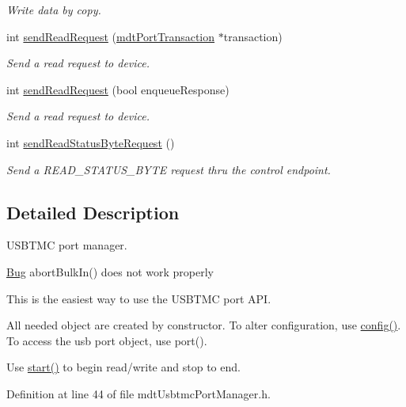 \begin{DoxyCompactItemize}
\begin{DoxyCompactList}\small\item\em Write data by copy. \end{DoxyCompactList}\item 
int \hyperlink{classmdt_usbtmc_port_manager_a2920bdd6b189f198f132de9e5555a78b}{sendReadRequest} (\hyperlink{classmdt_port_transaction}{mdtPortTransaction} $\ast$transaction)
\begin{DoxyCompactList}\small\item\em Send a read request to device. \end{DoxyCompactList}\item 
int \hyperlink{classmdt_usbtmc_port_manager_ab1604a1c8f2e9192714d039dbf9a5158}{sendReadRequest} (bool enqueueResponse)
\begin{DoxyCompactList}\small\item\em Send a read request to device. \end{DoxyCompactList}\item 
int \hyperlink{classmdt_usbtmc_port_manager_a7bcc280bd4a26ed523832550b1e61553}{sendReadStatusByteRequest} ()
\begin{DoxyCompactList}\small\item\em Send a READ\_\-STATUS\_\-BYTE request thru the control endpoint. \end{DoxyCompactList}\end{DoxyCompactItemize}


\subsection{Detailed Description}
USBTMC port manager. 

\begin{Desc}
\item[\hyperlink{bug__bug000002}{Bug}]abortBulkIn() does not work properly \end{Desc}


This is the easiest way to use the USBTMC port API.

All needed object are created by constructor. To alter configuration, use \hyperlink{classmdt_port_manager_a9cf3ea2da38f81682695b37448712ffd}{config()}. To access the usb port object, use port().

Use \hyperlink{classmdt_usb_port_manager_ac656805c6de08c9c6a2487291cf3f347}{start()} to begin read/write and stop to end. 

Definition at line 44 of file mdtUsbtmcPortManager.h.




